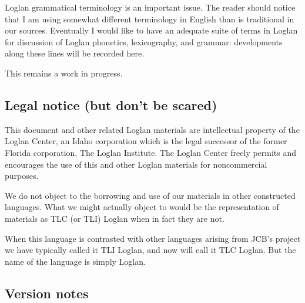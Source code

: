 \documentclass[12pt]{book}
\begin{document}
Loglan grammatical terminology is an important issue.  The reader should notice that I am using somewhat different terminology in English than is traditional in our sources.  Eventually I would like to have an adequate suite of terms in Loglan for discussion of Loglan phonetics, lexicography, and grammar:  developments along these lines will be recorded here.

This remains a work in progress.

\subsection{Legal notice (but don't be scared)}

This document and other related Loglan materials are intellectual property of the Loglan Center, an Idaho corporation which is the legal successor of the former Florida corporation, The Loglan Institute.   The Loglan Center freely permits and encourages the use of this and other Loglan materials for noncommercial purposes.

We do not object to the borrowing and use of our materials in other constructed languages.  What we might actually object to would be the representation of materials as TLC (or TLI) Loglan when in fact they are not.

When this language is contrasted with other languages arising from JCB's project we have typically called it TLI Loglan, and now will call it TLC Loglan.  But the name of the language is simply Loglan.

\subsection{Version notes}
\end{document}
